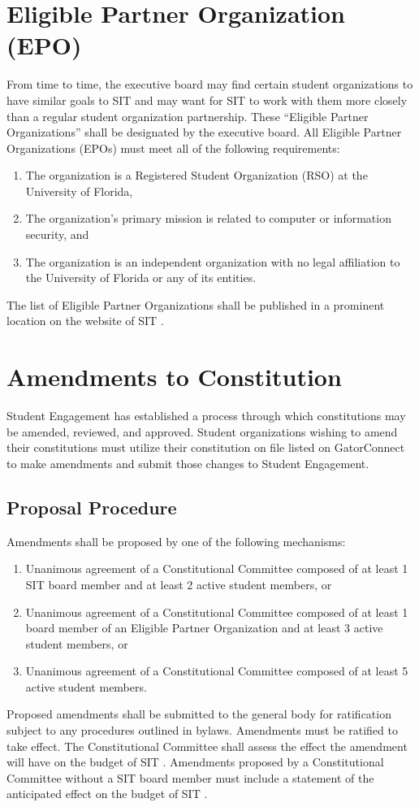 \documentclass{article}
\def\clubname{SIT }
\begin{document}
\section{Eligible Partner Organization (EPO)}
From time to time, the executive board may find certain student organizations to have similar goals to \clubname and may want for \clubname to work with them more closely than a regular student organization partnership. These ``Eligible Partner Organizations'' shall be designated by the executive board. All Eligible Partner Organizations (EPOs) must meet all of the following requirements:
\begin{enumerate}
	\item The organization is a Registered Student Organization (RSO) at the University of Florida,
	\item The organization's primary mission is related to computer or information security, and
	\item The organization is an independent organization with no legal affiliation to the University of Florida or any of its entities.
\end{enumerate}

The list of Eligible Partner Organizations shall be published in a prominent location on the website of \clubname.


\section{Amendments to Constitution}
Student Engagement has established a process through which constitutions may be amended, reviewed, and approved. Student organizations wishing to amend their constitutions must utilize their constitution on file listed on GatorConnect to make amendments and submit those changes to Student Engagement.

\subsection{Proposal Procedure}
Amendments shall be proposed by one of the following mechanisms:
\begin{enumerate}
	\item Unanimous agreement of a Constitutional Committee composed of at least 1 \clubname board member and at least 2 active student members, or
	\item Unanimous agreement of a Constitutional Committee composed of at least 1 board member of an Eligible Partner Organization and at least 3 active student members, or
	\item Unanimous agreement of a Constitutional Committee composed of at least 5 active student members.
\end{enumerate}
Proposed amendments shall be submitted to the general body for ratification subject to any procedures outlined in bylaws. Amendments must be ratified to take effect. The Constitutional Committee shall assess the effect the amendment will have on the budget of \clubname. Amendments proposed by a Constitutional Committee without a \clubname board member must include a statement of the anticipated effect on the budget of \clubname.
\end{document}
